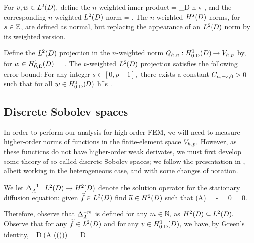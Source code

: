For $v,w \in \LtD,$ define the $n$-weighted inner product
\beqs
{} = \int_{D} n v \wbar,
\eeqs
and the corresponding $n$-weighted $\LtD$ norm
\beqs
{} = .
\eeqs
The $n$-weighted $\HsD$ norms, for $s \in \mathbb Z$, are defined as normal, but replacing the appearance of an $\LtD$ norm by its weighted version.

Define the $\LtD$ projection in the $n$-weighted norm $\Qhn:\HozDD\rightarrow \Vhp$ by, for $w \in \HozDD$
\beqs
{} =  \tforall \vh \in \Vhp.
\eeqs
The $n$-weighted $\LtD$ projection satisfies the following error bound:
\label{lem:wltdprojerr}
For any integer $s \in [0,p-1],$ there exists a constant $C_{n,-s,0} >0$ such that for all $w \in \HozDD$
\beq\label{eq:wltdprojerr}
 \leq \Cnmsz h^{s} .
\eeq
\ele{}

\subsection{Discrete Sobolev spaces}\label{sec:discsob}
In order to perform our analysis for high-order FEM, we will need to measure higher-order norms of functions in the finite-element space $V_{h,p}.$ However, as these functions do not have higher-order weak derivates, we must first develop some theory of so-called discrete Sobolev spaces; we follow the presentation in \cite{DuWu:15}, albeit working in the heterogeneous case, and with some changes of notation.

We let $\DeltaAI:\LtD\rightarrow\HtD$ denote the solution operator for the stationary diffusion equation: given $\ftilde \in \LtD$ find $\utilde \in \HtD$ such that
\beqs
\grad \cdot \mleft(A\grad \utilde\mright) = -\ftilde
\eeqs
\beqs
\trD \utilde = 0
\eeqs
\beqs
\dn \utilde = 0.
\eeqs
{}


Therefore, observe that $\Delta_{A}^{-m}$ is defined for any $m \in \mathbb N,$ as $\HtD \subseteq \LtD.$
Observe that for any $\ftilde \in \LtD$ and for any $v \in \HozDD,$ we have, by Green's identity,
\beq\label{eq:deltaagreen}
\int_D \mleft(A \grad \mleft(\DeltaAI(\ftilde)\mright)\mright)\cdot \grad \vb = \int_D \ftilde \vb
\eeq


